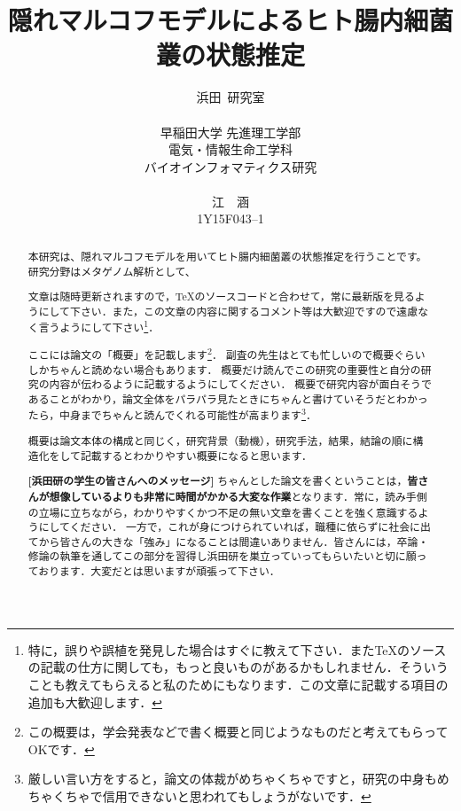 \documentclass[dvipdfmx,autodetect-engine]{jsreport}
\title{隠れマルコフモデルによるヒト腸内細菌叢の状態推定}
\author{浜田~研究室\\
\\
早稲田大学 先進理工学部\\
電気・情報生命工学科\\ 
バイオインフォマティクス研究\\
\\
江　涵\\
1Y15F043–1
}
\begin{document}
\maketitle

\begin{abstract}
本研究は、隠れマルコフモデルを用いてヒト腸内細菌叢の状態推定を行うことです。研究分野はメタゲノム解析として、

文章は随時更新されますので，\TeX のソースコードと合わせて，常に最新版を見るようにして下さい．また，この文章の内容に関するコメント等は大歓迎ですので遠慮なく言うようにして下さい\footnote{特に，誤りや誤植を発見した場合はすぐに教えて下さい．また\TeX のソースの記載の仕方に関しても，もっと良いものがあるかもしれません．そういうことも教えてもらえると私のためにもなります．この文章に記載する項目の追加も大歓迎します．}．

\vspace{5mm}

ここには論文の「概要」を記載します\footnote{この概要は，学会発表などで書く概要と同じようなものだと考えてもらってOKです．}．
副査の先生はとても忙しいので概要ぐらいしかちゃんと読めない場合もあります．
概要だけ読んでこの研究の重要性と自分の研究の内容が伝わるように記載するようにしてください．
概要で研究内容が面白そうであることがわかり，論文全体をパラパラ見たときにちゃんと書けていそうだとわかったら，中身までちゃんと読んでくれる可能性が高まります\footnote{厳しい言い方をすると，論文の体裁がめちゃくちゃですと，研究の中身もめちゃくちゃで信用できないと思われてもしょうがないです．}．

概要は論文本体の構成と同じく，研究背景（動機），研究手法，結果，結論の順に構造化をして記載するとわかりやすい概要になると思います．

\vspace{10mm}

\textbf{[浜田研の学生の皆さんへのメッセージ]}
ちゃんとした論文を書くということは，\textbf{皆さんが想像しているよりも非常に時間がかかる大変な作業}となります．常に，読み手側の立場に立ちながら，わかりやすくかつ不足の無い文章を書くことを強く意識するようにしてください．
一方で，これが身につけられていれば，職種に依らずに社会に出てから皆さんの大きな「強み」になることは間違いありません．皆さんには，卒論・修論の執筆を通してこの部分を習得し浜田研を巣立っていってもらいたいと切に願っております．大変だとは思いますが頑張って下さい．


\end{abstract}

\setcounter{tocdepth}{2} %
\tableofcontents
\end{document}
